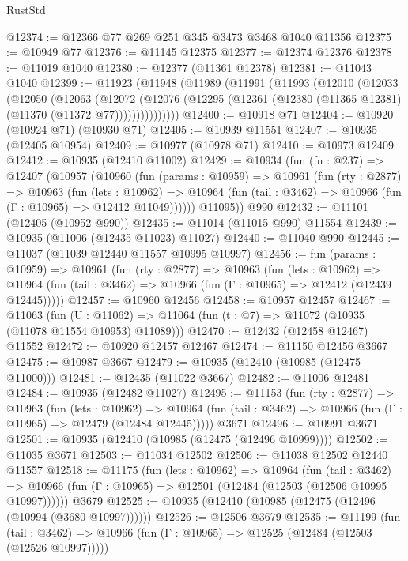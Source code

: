 \begin{lexlean}{RustStd}
\begin{coremodule}
{\begin{coremodule}
{{{{{{{{{{{{{{{{{{{{{{{{{{{{{{{{{{{{{{{{{{{{{{{{{{{{{{{{{{{{{{{{{{{{{{{{{{{{{{{{{{{{{@12374 := @12366 @77 @269 @251 @345 @3473 @3468 @1040 @11356
@12375 := @10949 @77
@12376 := @11145 @12375
@12377 := @12374 @12376
@12378 := @11019 @1040
@12380 := @12377 (@11361 @12378)
@12381 := @11043 @1040
@12399 := @11923
    (@11948
      (@11989
        (@11991
          (@11993
            (@12010
              (@12033
                (@12050
                  (@12063
                    (@12072
                      (@12076
                        (@12295 (@12361 (@12380 (@11365 @12381) (@11370 (@11372 @77)))))))))))))))
@12400 := @10918 @71
@12404 := @10920 (@10924 @71) (@10930 @71)
@12405 := @10939 @11551
@12407 := @10935 (@12405 @10954)
@12409 := @10977 (@10978 @71)
@12410 := @10973 @12409
@12412 := @10935 (@12410 @11002)
@12429 := @10934
    (fun (fn : @237) =>
    @12407
      (@10957
        (@10960
          (fun (params : @10959) =>
          @10961
            (fun (rty : @2877) =>
            @10963
              (fun (lets : @10962) =>
              @10964 (fun (tail : @3462) => @10966 (fun (Γ : @10965) => @12412 @11049))))))
        @11095))
    @990
@12432 := @11101 (@12405 (@10952 @990))
@12435 := @11014 (@11015 @990) @11554
@12439 := @10935 (@11006 (@12435 @11023) @11027)
@12440 := @11040 @990
@12445 := @11037 (@11039 @12440 @11557 @10995 @10997)
@12456 := fun (params : @10959) =>
  @10961
    (fun (rty : @2877) =>
    @10963
      (fun (lets : @10962) =>
      @10964 (fun (tail : @3462) => @10966 (fun (Γ : @10965) => @12412 (@12439 @12445)))))
@12457 := @10960 @12456
@12458 := @10957 @12457
@12467 := @11063
    (fun (U : @11062) => @11064 (fun (t : @7) => @11072 (@10935 (@11078 @11554 @10953) @11089)))
@12470 := @12432 (@12458 @12467) @11552
@12472 := @10920 @12457 @12467
@12474 := @11150 @12456 @3667
@12475 := @10987 @3667
@12479 := @10935 (@12410 (@10985 (@12475 @11000)))
@12481 := @12435 (@11022 @3667)
@12482 := @11006 @12481
@12484 := @10935 (@12482 @11027)
@12495 := @11153
    (fun (rty : @2877) =>
    @10963
      (fun (lets : @10962) =>
      @10964 (fun (tail : @3462) => @10966 (fun (Γ : @10965) => @12479 (@12484 @12445)))))
    @3671
@12496 := @10991 @3671
@12501 := @10935 (@12410 (@10985 (@12475 (@12496 @10999))))
@12502 := @11035 @3671
@12503 := @11034 @12502
@12506 := @11038 @12502 @12440 @11557
@12518 := @11175
    (fun (lets : @10962) =>
    @10964
      (fun (tail : @3462) =>
      @10966 (fun (Γ : @10965) => @12501 (@12484 (@12503 (@12506 @10995 @10997))))))
    @3679
@12525 := @10935 (@12410 (@10985 (@12475 (@12496 (@10994 (@3680 @10997))))))
@12526 := @12506 @3679
@12535 := @11199
    (fun (tail : @3462) => @10966 (fun (Γ : @10965) => @12525 (@12484 (@12503 (@12526 @10997)))))
}}}}}}}}}}}}}}}}}}}}}}}}}}}}}}}}}}}}}}}}}}}}}}}}}}}}}}}}}}}}}}}}}}}}}}}}}}}}}}}}}}}}}
\end{coremodule}}
\end{coremodule}
\end{lexlean}
